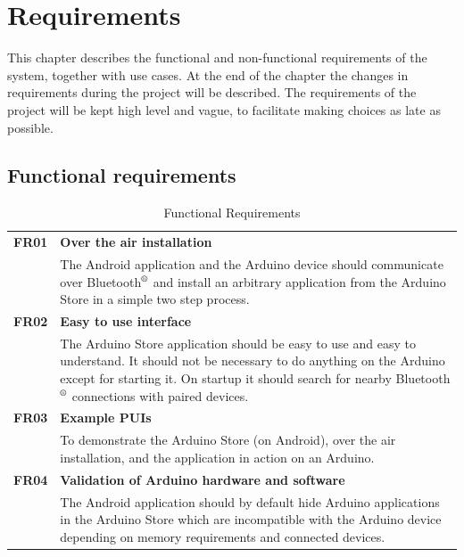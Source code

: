 \chapter{Requirements}
This chapter describes the functional and non-functional requirements of the system, together with use cases. At the end of the chapter the changes in requirements during the project will be described.
The requirements of the project will be kept high level and vague, to facilitate making choices as late as possible.
\section{Functional requirements}
\begin{table}[H]
\begin{tabularx}{\linewidth}{lX}
\textbf{FR01} & \textbf{Over the air installation}\\
 & The Android application and the Arduino device should communicate over Bluetooth$\textsuperscript{\textregistered}$  and install an arbitrary application from the Arduino Store in a simple two step process.\\
\textbf{FR02} & \textbf{Easy to use interface}\\
 & The Arduino Store application should be easy to use and easy to understand. It should not be necessary to do anything on the Arduino except for starting it. On startup it should search for nearby Bluetooth$\textsuperscript{\textregistered}$  connections with paired devices.\\
 \textbf{FR03} & \textbf{Example PUIs}\\
 & To demonstrate the Arduino Store (on Android), over the air installation, and the application in action on an Arduino.\\
\textbf{FR04} & \textbf{Validation of Arduino hardware and software}\\
 & The Android application should by default hide Arduino applications in the Arduino Store which are incompatible with the Arduino device depending on memory requirements and connected devices.\\
\end{tabularx}
\caption{Functional Requirements}
\end{table}

